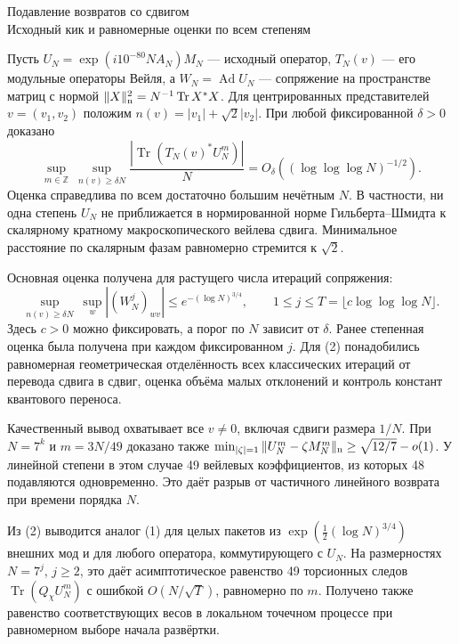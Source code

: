 \documentclass[11pt,a4paper]{article}
\newcommand{\Tr}{\operatorname{Tr}}
\newcommand{\Z}{\mathbb Z}
\begin{document}
\begin{center}{\LARGE\sffamily Подавление возвратов со сдвигом}\\[4pt]
{\large Исходный кик и равномерные оценки по всем степеням}
\end{center}
Пусть $U_N=\exp(i10^{-80}NA_N)M_N$ --- исходный оператор, $T_N(v)$ --- его модульные операторы Вейля, а $W_N=\operatorname{Ad}U_N$ --- сопряжение на пространстве матриц с нормой $\|X\|_{\rm n}^2=N^{-1}\Tr X^*X$. Для центрированных представителей $v=(v_1,v_2)$ положим $n(v)=|v_1|+\sqrt2|v_2|$. При любой фиксированной $\delta>0$ доказано
\[
 \boxed{\displaystyle
  \sup_{m\in\Z}\ \sup_{n(v)\ge\delta N}
      \frac{|\Tr(T_N(v)^*U_N^m)|}{N}
      =O_\delta\!\left((\log\log\log N)^{-1/2}\right).}                \tag{1}
\]
Оценка справедлива по всем достаточно большим нечётным $N$. В частности, ни одна степень $U_N$ не приближается в нормированной норме Гильберта--Шмидта к скалярному кратному макроскопического вейлева сдвига. Минимальное расстояние по скалярным фазам равномерно стремится к $\sqrt2$.

Основная оценка получена для растущего числа итераций сопряжения:
\[
 \sup_{n(v)\ge\delta N}\ \sup_w |(W_N^j)_{wv}|
     \le e^{-(\log N)^{3/4}},\qquad
               1\le j\le T=\lfloor c\log\log\log N\rfloor.           \tag{2}
\]
Здесь $c>0$ можно фиксировать, а порог по $N$ зависит от $\delta$. Ранее степенная оценка была получена при каждом фиксированном $j$. Для (2) понадобились равномерная геометрическая отделённость всех классических итераций от перевода сдвига в сдвиг, оценка объёма малых отклонений и контроль констант квантового переноса.

Качественный вывод охватывает все $v\ne0$, включая сдвиги размера $1/N$. При $N=7^k$ и $m=3N/49$ доказано также $\min_{|\zeta|=1}\|U_N^m-\zeta M_N^m\|_{\rm n}\ge\sqrt{12/7}-o(1)$. У линейной степени в этом случае 49 вейлевых коэффициентов, из которых 48 подавляются одновременно. Это даёт разрыв от частичного линейного возврата при времени порядка $N$.

Из (2) выводится аналог (1) для целых пакетов из $\exp(\tfrac12(\log N)^{3/4})$ внешних мод и для любого оператора, коммутирующего с $U_N$. На размерностях $N=7^j$, $j\ge2$, это даёт асимптотическое равенство 49 торсионных следов $\Tr(Q_\chi U_N^m)$ с ошибкой $O(N/\sqrt T)$, равномерно по $m$. Получено также равенство соответствующих весов в локальном точечном процессе при равномерном выборе начала развёртки.
\end{document}
